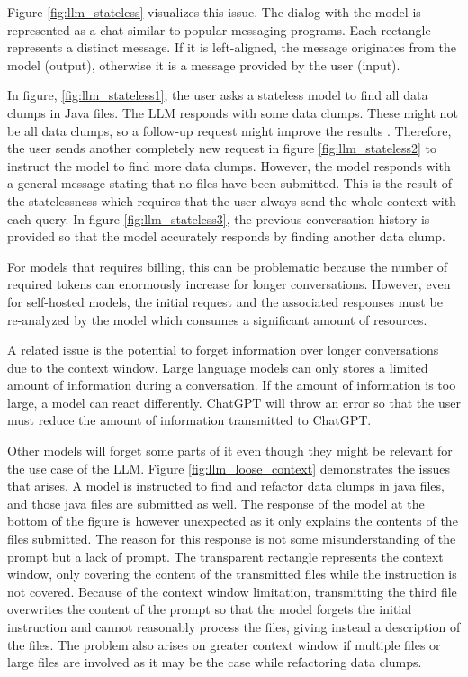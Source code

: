 Figure \ref{fig:llm_stateless} visualizes this issue. The dialog with the model is represented as a chat similar to popular messaging programs. Each rectangle represents a distinct message. If it is left-aligned, the message originates from the model (output), otherwise it is a message provided by the user (input). 

In figure, \ref{fig:llm_stateless1}, the user asks a stateless model to find all data clumps in Java files. The \ac{LLM} responds with some data clumps. These might not be all data clumps, so a follow-up request might improve the results \cite{10062688}. Therefore, the user sends another completely new request in figure \ref{fig:llm_stateless2} to instruct the model to find more data clumps. However, the model responds with a general message stating that no files have been submitted. This is the result of the statelessness which requires that the user always send the whole context with each query. In figure \ref{fig:llm_stateless3}, the previous conversation history is provided so that the model accurately responds by finding another data clump.

For models that requires billing, this can be problematic  because the number of required tokens can enormously increase for longer conversations. However, even for self-hosted models, the initial request and the associated responses must be re-analyzed by the model which  consumes a significant amount of resources.


A related issue is the potential to forget information over longer conversations due to the context window. Large language models can only stores a limited amount of information during a conversation. If the amount of information is too large,  a model can react differently. ChatGPT will throw an error so that the user must reduce the amount of information transmitted to ChatGPT.

Other models will forget some parts of it even though they might be relevant for the use case of the \ac{LLM}. Figure \ref{fig:llm_loose_context} demonstrates the issues that arises.  A model is instructed to find and refactor data clumps in java files, and those java files are submitted as well. The response of the model at the bottom of the figure is however unexpected as it only explains the contents of the files submitted. The reason for this response is not some misunderstanding of the prompt but a lack of prompt. The transparent rectangle represents the context window, only covering the content of the transmitted files while the instruction is not covered. 
Because of the context window limitation, transmitting the third file overwrites the content of the prompt so that the model forgets the initial instruction and cannot reasonably process the files, giving instead a description of the files. The problem also arises on greater context window if multiple files or large files are involved as it may be the case while refactoring data clumps.

